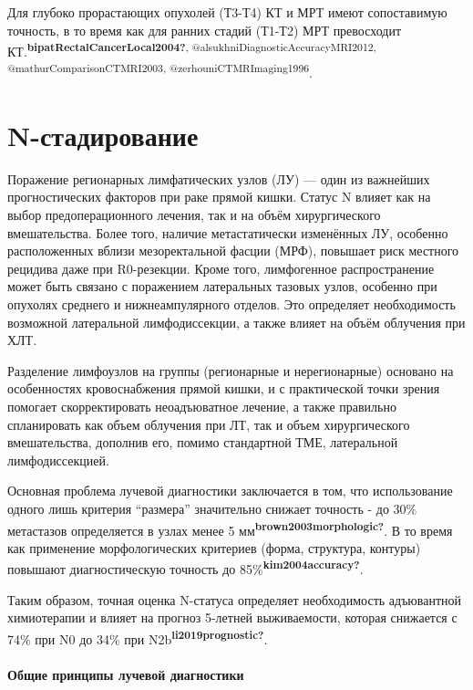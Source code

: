 \documentclass[
  russian,
  12pt,
  a4paper,
]{report}
\begin{document}
Для глубоко прорастающих опухолей (Т3-Т4) КТ и МРТ имеют сопоставимую
точность, в то время как для ранних стадий (Т1-Т2) МРТ превосходит
КТ.\textsuperscript{\textbf{bipatRectalCancerLocal2004?},
@alsukhniDiagnosticAccuracyMRI2012, @mathurComparisonCTMRI2003,
@zerhouniCTMRImaging1996}.

\chapter{N-стадирование}\label{n-ux441ux442ux430ux434ux438ux440ux43eux432ux430ux43dux438ux435}

Поражение регионарных лимфатических узлов (ЛУ) --- один из важнейших
прогностических факторов при раке прямой кишки. Статус N влияет как на
выбор предоперационного лечения, так и на объём хирургического
вмешательства. Более того, наличие метастатически изменённых ЛУ,
особенно расположенных вблизи мезоректальной фасции (МРФ), повышает риск
местного рецидива даже при R0-резекции. Кроме того, лимфогенное
распространение может быть связано с поражением латеральных тазовых
узлов, особенно при опухолях среднего и нижнеампулярного отделов. Это
определяет необходимость возможной латеральной лимфодиссекции, а также
влияет на объём облучения при ХЛТ.

Разделение лимфоузлов на группы (регионарные и нерегионарные) основано
на особенностях кровоснабжения прямой кишки, и с практической точки
зрения помогает скорректировать неоадъюватное лечение, а также правильно
спланировать как объем облучения при ЛТ, так и объем хирургического
вмешательства, дополнив его, помимо стандартной ТМЕ, латеральной
лимфодиссекцией.

Основная проблема лучевой диагностики заключается в том, что
использование одного лишь критерия ``размера'' значительно снижает
точность - до 30\% метастазов определяется в узлах менее 5
мм\textsuperscript{\textbf{brown2003morphologic?}}. В то время как
применение морфологических критериев (форма, структура, контуры)
повышают диагностическую точность до
85\%\textsuperscript{\textbf{kim2004accuracy?}}.

Таким образом, точная оценка N-статуса определяет необходимость
адъювантной химиотерапии и влияет на прогноз 5-летней выживаемости,
которая снижается с 74\% при N0 до 34\% при
N2b\textsuperscript{\textbf{li2019prognostic?}}.

\subsubsection{Общие принципы лучевой
диагностики}\label{ux43eux431ux449ux438ux435-ux43fux440ux438ux43dux446ux438ux43fux44b-ux43bux443ux447ux435ux432ux43eux439-ux434ux438ux430ux433ux43dux43eux441ux442ux438ux43aux438-1}
\end{document}
